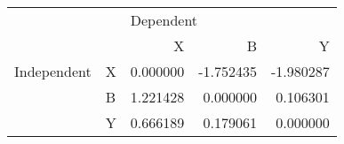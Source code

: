 \begin{tabular}{llrrr}
\toprule
            &   & \multicolumn{3}{l}{Dependent} \\
            &   &         X &         B &         Y \\
\midrule
Independent & X &  0.000000 & -1.752435 & -1.980287 \\
            & B &  1.221428 &  0.000000 &  0.106301 \\
            & Y &  0.666189 &  0.179061 &  0.000000 \\
\bottomrule
\end{tabular}
